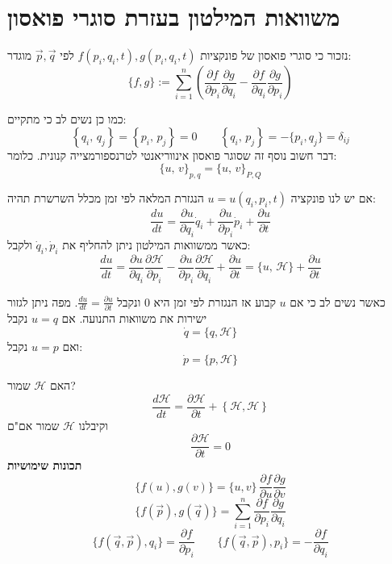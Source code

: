 \documentclass{tstextbook}
\begin{document}
\section{משוואות המילטון בעזרת סוגרי פואסון}

נזכור כי סוגרי פואסון של פונקציות \(f(p_{i},q_{i},t),g(p_{i},q_{i},t)\) לפי \(\vec{p},\vec{q}\) מוגדר:
$$\{f,g\}:=\sum_{i=1}^{n}\left({\frac{\partial f}{\partial p_{i}}}{\frac{\partial g}{\partial q_{i}}}-{\frac{\partial f}{\partial q_{i}}}{\frac{\partial g}{\partial p_{i}}}\right)$$

כמו כן נשים לב כי מתקיים:
$$\left\{ q_{i},\,q_{j} \right\}=\left\{ p_{i},\,p_{j} \right\}=0 \qquad \left\{ q_{i},\,p_{j} \right\}=-\{p_{i},q_{j}\}=\delta_{i j}$$
דבר חשוב נוסף זה שסוגר פואסון אינווריאנטי לטרנספורמצייה קנונית. כלומר:
$$\{u,\,v\}_{p,q}=\{u,\,v\}_{{P},{ Q}}$$

אם יש לנו פונקציה \(u=u(q_{i},p_{i},t)\) הנגזרת המלאה לפי זמן מכלל השרשרת תהיה:
$${\frac{d u}{d t}}={\frac{\partial u}{\partial q_{i}}}{\dot{q}}_{i}+{\frac{\partial u}{\partial p_{i}}}{\dot{p}}_{i}+{\frac{\partial u}{\partial t}}$$
כאשר ממשוואות המילטון ניתן להחליף את \(\dot{q}_{i},\dot{p}_{i}\) ולקבל:
$${{\displaystyle{\frac{d u}{d t}}=\frac{\partial u}{\partial q_{i}}\frac{\partial \mathcal{\mathcal{H}}}{\partial p_{i}}-\frac{\partial u}{\partial p_{i}}\frac{\partial \mathcal{\mathcal{H}}}{\partial q_{i}}+\frac{\partial u}{\partial t}}} {{\displaystyle{=\{u,\,\mathcal{\mathcal{H}}\}+\frac{\partial u}{\partial t}}}}$$

כאשר נשים לב כי אם \(u\) קבוע אז הנגזרת לפי זמן היא 0 ונקבל \(\frac{du}{dt}=\frac{\partial u}{\partial t}\). מפה ניתן לגזור ישירות את משוואות התנועה. אם \(u=q\) נקבל 
$$\dot{q}=\{q,\mathcal{\mathcal{H}}\}$$
ואם \(u=p\) נקבל:
$${\dot{p}}=\{p,\mathcal{\mathcal{H}}\}$$

\begin{example}
האם \(\mathcal{\mathcal{\mathcal{H}}}\) שמור?
$$\frac{d\mathcal{\mathcal{\mathcal{H}}}}{dt}=\frac{\partial \mathcal{\mathcal{\mathcal{H}}}}{\partial t}+\left\{  \mathcal{\mathcal{\mathcal{H}}},\mathcal{\mathcal{\mathcal{H}}}  \right\}$$
וקיבלנו \(\mathcal{\mathcal{\mathcal{H}}}\) שמור אם"ם $$\frac{\partial \mathcal{\mathcal{\mathcal{H}}}}{\partial t}=0$$\textbf{תכונות שימושיות}$$\{f(u),g(v)\}=\{u,v\}\,\frac{\partial f}{\partial u}\frac{\partial g}{\partial v}$$$$\{f(\vec{p}),g(\vec{q})\}=\sum_{i=1}^{n}\frac{\partial f}{\partial p_{i}}\frac{\partial g}{\partial q_{i}}$$$$\{f\left(\vec{q},\vec{p}\right),q_{i}\}=\frac{\partial f}{\partial p_{i}}\qquad\{f\left(\vec{q},\vec{p}\right),p_{i}\}=-\frac{\partial f}{\partial q_{i}}$$

\end{example}
\end{document}
